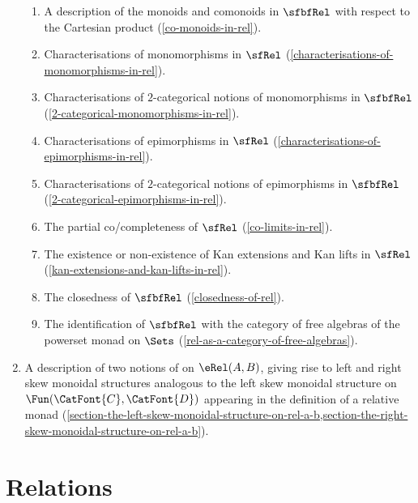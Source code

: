 \begin{enumerate}
\begin{enumerate}
            \item A description of the monoids and comonoids in $\sfbfRel$ with respect to the Cartesian product (\cref{co-monoids-in-rel}).
            \item Characterisations of monomorphisms in $\sfRel$ (\cref{characterisations-of-monomorphisms-in-rel}).
            \item Characterisations of $2$-categorical notions of monomorphisms in $\sfbfRel$ (\cref{2-categorical-monomorphisms-in-rel}).
            \item Characterisations of epimorphisms in $\sfRel$ (\cref{characterisations-of-epimorphisms-in-rel}).
            \item Characterisations of $2$-categorical notions of epimorphisms in $\sfbfRel$ (\cref{2-categorical-epimorphisms-in-rel}).
            \item The partial co/completeness of $\sfRel$ (\cref{co-limits-in-rel}).
            \item The existence or non-existence of Kan extensions and Kan lifts in $\sfRel$ (\cref{kan-extensions-and-kan-lifts-in-rel}).
            \item The closedness of $\sfbfRel$ (\cref{closedness-of-rel}).
            \item The identification of $\sfbfRel$ with the category of free algebras of the powerset monad on $\Sets$ (\cref{rel-as-a-category-of-free-algebras}).
        \end{enumerate}
    \item A description of two notions of  on $\eRel(A,B)$, giving rise to left and right skew monoidal structures analogous to the left skew monoidal structure on $\Fun(\CatFont{C},\CatFont{D})$ appearing in the definition of a relative monad (\cref{section-the-left-skew-monoidal-structure-on-rel-a-b,section-the-right-skew-monoidal-structure-on-rel-a-b}).
\end{enumerate}

\ChapterTableOfContents

\section{Relations}\label{section-relations}

